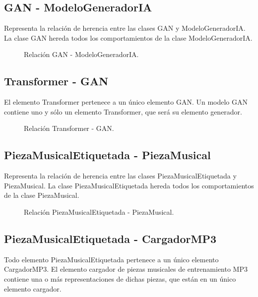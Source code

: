 \subsection{GAN - ModeloGeneradorIA}

Representa la relación de herencia entre las clases GAN y ModeloGeneradorIA. La clase GAN hereda todos los comportamientos de la clase ModeloGeneradorIA.

\begin{figure}[H]
  \centering
  
  \caption{Relación GAN - ModeloGeneradorIA.}
\end{figure}

\subsection{Transformer - GAN}

El elemento Transformer pertenece a un único elemento GAN. Un modelo GAN contiene uno y sólo un elemento Transformer, que será su elemento generador.

\begin{figure}[H]
  \centering
  
  \caption{Relación Transformer - GAN.}
\end{figure}

\subsection{PiezaMusicalEtiquetada - PiezaMusical}

Representa la relación de herencia entre las clases PiezaMusicalEtiquetada y PiezaMusical. La clase PiezaMusicalEtiquetada hereda todos los comportamientos de la clase PiezaMusical.

\begin{figure}[H]
  \centering
  
  \caption{Relación PiezaMusicalEtiquetada - PiezaMusical.}
\end{figure}

\subsection{PiezaMusicalEtiquetada - CargadorMP3}

Todo elemento PiezaMusicalEtiquetada pertenece a un único elemento CargadorMP3. El elemento cargador de piezas musicales de entrenamiento MP3 contiene una o más representaciones de dichas piezas, que están en un único elemento cargador.

